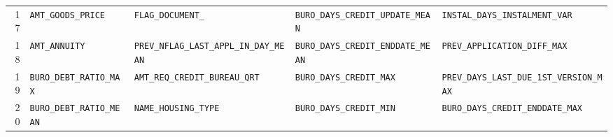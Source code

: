 \documentclass[final,5p,twocolumn]{elsarticle}
\begin{document}
\begin{table}[htbp]
\begin{threeparttable}
\begin{tabular}{@{}rL{40mm}L{40mm}L{40mm}L{40mm}@{}}
17 & \texttt{AMT\_\allowbreak GOODS\_\allowbreak PRICE} & \texttt{FLAG\_\allowbreak DOCUMENT\_} & \texttt{BURO\_\allowbreak DAYS\_\allowbreak CREDIT\_\allowbreak UPDATE\_\allowbreak MEAN} & \texttt{INSTAL\_\allowbreak DAYS\_\allowbreak INSTALMENT\_\allowbreak VAR} \\
18 & \texttt{AMT\_\allowbreak ANNUITY} & \texttt{PREV\_\allowbreak NFLAG\_\allowbreak LAST\_\allowbreak APPL\_\allowbreak IN\_\allowbreak DAY\_\allowbreak MEAN} & \texttt{BURO\_\allowbreak DAYS\_\allowbreak CREDIT\_\allowbreak ENDDATE\_\allowbreak MEAN} & \texttt{PREV\_\allowbreak APPLICATION\_\allowbreak DIFF\_\allowbreak MAX} \\
19 & \texttt{BURO\_\allowbreak DEBT\_\allowbreak RATIO\_\allowbreak MAX} & \texttt{AMT\_\allowbreak REQ\_\allowbreak CREDIT\_\allowbreak BUREAU\_\allowbreak QRT} & \texttt{BURO\_\allowbreak DAYS\_\allowbreak CREDIT\_\allowbreak MAX} & \texttt{PREV\_\allowbreak DAYS\_\allowbreak LAST\_\allowbreak DUE\_\allowbreak 1ST\_\allowbreak VERSION\_\allowbreak MAX} \\
20 & \texttt{BURO\_\allowbreak DEBT\_\allowbreak RATIO\_\allowbreak MEAN} & \texttt{NAME\_\allowbreak HOUSING\_\allowbreak TYPE} & \texttt{BURO\_\allowbreak DAYS\_\allowbreak CREDIT\_\allowbreak MIN} & \texttt{BURO\_\allowbreak DAYS\_\allowbreak CREDIT\_\allowbreak ENDDATE\_\allowbreak MAX} \\
\bottomrule
\end{tabular}
\end{threeparttable}
\end{table}
\end{document}
